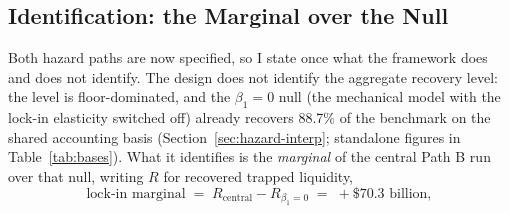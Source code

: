\documentclass[12pt]{article}
\begin{document}
\subsection{Identification: the Marginal over the Null}\label{sec:identification}

Both hazard paths are now specified, so I state once what the framework does and does not identify. The design does not identify the aggregate recovery level: the level is floor-dominated, and the $\beta_1 = 0$ null (the mechanical model with the lock-in elasticity switched off) already recovers 88.7\% of the benchmark on the shared accounting basis (Section~\ref{sec:hazard-interp}; standalone figures in Table~\ref{tab:bases}). What it identifies is the \emph{marginal} of the central Path B run over that null, writing $R$ for recovered trapped liquidity,
\begin{equation}\label{eq:marginal}
\text{lock-in marginal} \;=\; R_{\text{central}} - R_{\beta_1 = 0} \;=\; +\$70.3\text{ billion},
\end{equation}
\end{document}
